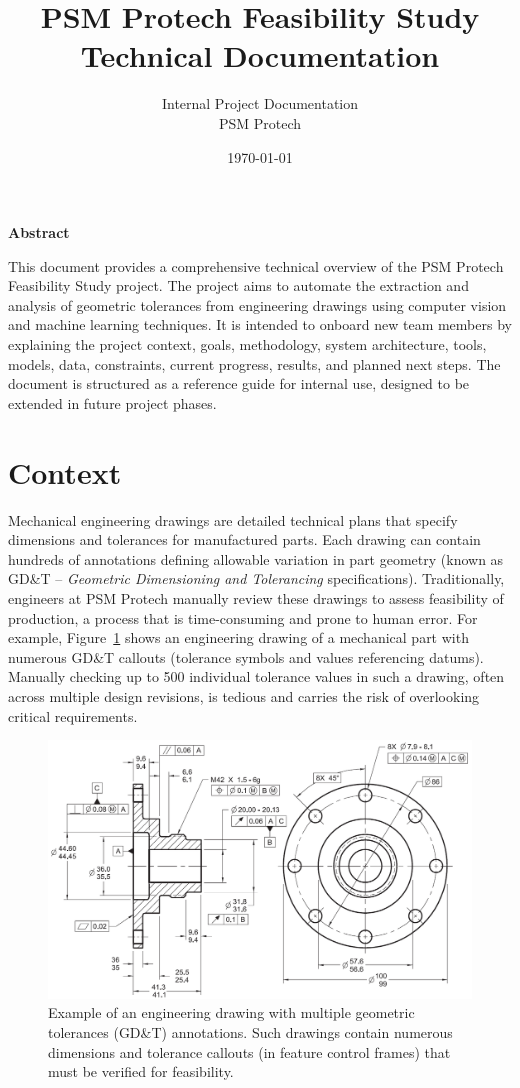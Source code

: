 \documentclass[11pt,a4paper]{article}
\title{\textbf{PSM Protech Feasibility Study}\\Technical Documentation}
\author{Internal Project Documentation \\ PSM Protech}
\date{\today}
\begin{document}
\maketitle
\thispagestyle{empty}
\begin{center}
\textbf{Abstract}
\end{center}
\noindent
This document provides a comprehensive technical overview of the PSM Protech Feasibility Study project. The project aims to automate the extraction and analysis of geometric tolerances from engineering drawings using computer vision and machine learning techniques. It is intended to onboard new team members by explaining the project context, goals, methodology, system architecture, tools, models, data, constraints, current progress, results, and planned next steps. The document is structured as a reference guide for internal use, designed to be extended in future project phases.

\vfill
\tableofcontents
\newpage

\section{Context}
Mechanical engineering drawings are detailed technical plans that specify dimensions and tolerances for manufactured parts. Each drawing can contain hundreds of annotations defining allowable variation in part geometry (known as GD\&T -- \emph{Geometric Dimensioning and Tolerancing} specifications). Traditionally, engineers at PSM Protech manually review these drawings to assess feasibility of production, a process that is time-consuming and prone to human error. For example, Figure~\ref{fig:example_drawing} shows an engineering drawing of a mechanical part with numerous GD\&T callouts (tolerance symbols and values referencing datums). Manually checking up to 500 individual tolerance values in such a drawing, often across multiple design revisions, is tedious and carries the risk of overlooking critical requirements.

\begin{figure}[h!]
\centering
\includegraphics[width=\textwidth]{GDD-Drawing-Example.png}
\caption{Example of an engineering drawing with multiple geometric tolerances (GD\&T) annotations. Such drawings contain numerous dimensions and tolerance callouts (in feature control frames) that must be verified for feasibility.}
\label{fig:example_drawing}
\end{figure}
\end{document}

